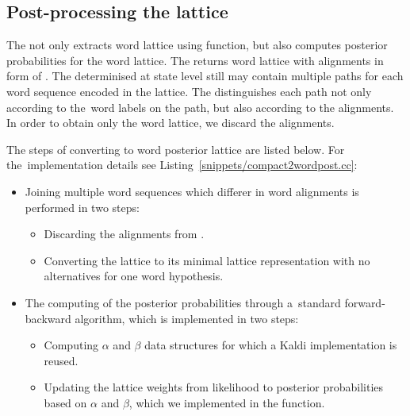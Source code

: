 \subsection{Post-processing the lattice}
\label{sub:postprocess}
The  not only extracts word lattice using  function, but also computes posterior probabilities for the word lattice.
The  returns word lattice with alignments in form of .
The  determinised at state level still may contain multiple paths for each word sequence encoded in the lattice.
The  distinguishes each path not only according to the~word labels on the path, but also according to the alignments.
In order to obtain only the word lattice,  we discard the alignments. 

%


The steps of converting  to word posterior lattice are listed below.
For the~implementation details see Listing~\ref{snippets/compact2wordpost.cc}:
\begin{itemize}
    \item Joining multiple word sequences which differer in word alignments is performed in two steps:
    \begin{itemize}
        \item Discarding the alignments from .
        \item Converting the lattice to its minimal lattice representation with no alternatives for one word hypothesis. 
    \end{itemize}
    \item The computing of the posterior probabilities through a~standard forward-backward algorithm, which is implemented in two steps:
    \begin{itemize}
        \item Computing $\alpha$ and $\beta$ data structures for which a Kaldi implementation is reused.
        \item Updating the lattice weights from likelihood to posterior probabilities based on $\alpha$ and $\beta$, which we implemented in the  function.
    \end{itemize}
\end{itemize}

